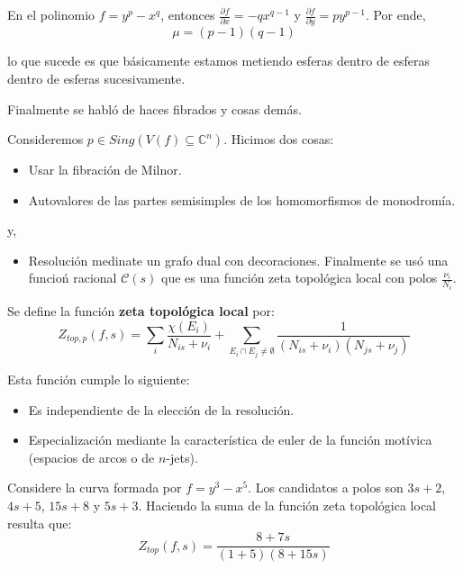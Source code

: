 \documentclass[12pt]{report}
\newcounter{it}
\theoremstyle{largebreak}
\begin{document}
    \begin{exa}
        En el polinomio $f=y^p-x^q$, entonces $\frac{\partial f}{\partial x}=-qx^{q-1}$ y $\frac{\partial f}{\partial y}=py^{p-1}$. Por ende,
        \begin{equation*}
            \mu=(p-1)(q-1)
        \end{equation*}
    \end{exa}

    lo que sucede es que básicamente estamos metiendo esferas dentro de esferas dentro de esferas sucesivamente.

    Finalmente se habló de haces fibrados y cosas demás.

    Consideremos $p\in Sing(V(f)\subseteq\mathbb{C}^n)$. Hicimos dos cosas:
    \begin{itemize}
        \item Usar la fibración de Milnor.
        \item Autovalores de las partes semisimples de los homomorfismos de monodromía.
    \end{itemize}
    y,
    \begin{itemize}
        \item Resolución medinate un grafo dual con decoraciones. Finalmente se usó una funcioń racional $\mathcal{C}(s)$ que es una función zeta topológica local con polos $\frac{\nu_i}{N_i}$.
    \end{itemize}

    \begin{mydef}
        Se define la función \textbf{zeta topológica local} por:
        \begin{equation*}
            Z_{top,p}(f,s)=\sum_{ i}\frac{\chi(E_i)}{N_{ is}+\nu_i}+\sum_{ E_i\cap E_j\neq\emptyset}\frac{1}{(N_{ is}+\nu_i)(N_{ js}+\nu_j)}
        \end{equation*}
    \end{mydef}

    \begin{obs}
        Esta función cumple lo siguiente:
        \begin{itemize}
            \item Es independiente de la elección de la resolución.
            \item Especialización mediante la característica de euler de la función motívica (espacios de arcos o de $n$-jets).
        \end{itemize}
    \end{obs}

    \begin{exa}
        Considere la curva formada por $f=y^3-x^5$. Los candidatos a polos son $3s+2$, $4s+5$, $15s+8$ y $5s+3$. Haciendo la suma de la función zeta topológica local resulta que:
        \begin{equation*}
            Z_{ top}(f,s)=\frac{8+7s}{(1+5)(8+15s)}
        \end{equation*}
    \end{exa}
\end{document}
